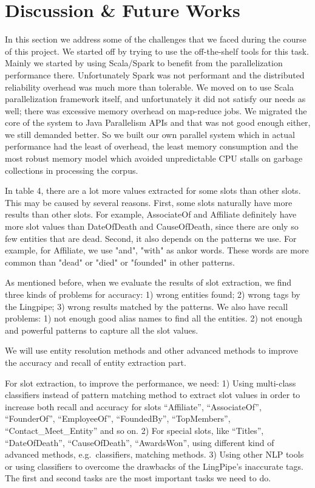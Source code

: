 

\section{Discussion \& Future Works}

In this section we address some of the challenges that we faced during the course of this project. We started 
off by trying to use the off-the-shelf tools for this task. Mainly we started 
by using Scala/Spark\cite{ferc11} to benefit from the parallelization 
performance there. Unfortunately Spark was not performant and the distributed reliability overhead 
was much more than tolerable. We moved on to use Scala parallelization  framework itself, and unfortunately it did not satisfy our needs as well; there was 
excessive memory overhead on map-reduce jobs. We migrated the core of the 
system to Java Parallelism APIs and that was not good enough either, we still demanded 
better. So we built our own parallel system which in actual performance had 
the least of overhead, the least memory consumption and the most robust memory 
model which avoided unpredictable CPU stalls on garbage collections in 
processing the corpus.

In table 4, there are a lot more values extracted for some slots than other slots. This may be caused by several reasons.
First, some slots naturally have more results than other slots. For example, AssociateOf and Affiliate definitely have more slot values than DateOfDeath and CauseOfDeath, since there are only so few entities that are dead. Second, it also depends on the patterns we use. For example, for Affiliate, we use "and", "with" as ankor words. These words are more common than "dead" or "died" or "founded" in other patterns. 

As mentioned before, when we evaluate the results of slot extraction, we find 
three kinds of problems for accuracy: 1) wrong entities found; 2) wrong tags 
by the Lingpipe; 3) wrong results matched by the patterns.  We also have 
recall problems: 1) not enough good alias names to find all the entities. 2) 
not enough and powerful patterns to capture all the slot values. 

We will use entity resolution methods and other advanced methods to improve 
the accuracy and recall of entity extraction part. 

For slot extraction, to improve the performance, we need: 1) Using multi-class classifiers instead of pattern matching method to 
extract slot values in order to increase both recall and accuracy for slots
``Affiliate'', ``AssociateOf'', ``FounderOf'', ``EmployeeOf'', ``FoundedBy'',
``TopMembers'', ``Contact\_Meet\_Entity'' and so on. 2) For special slots, 
like ``Titles'', ``DateOfDeath'', ``CauseOfDeath'', ``AwardsWon'', using different 
kind of advanced methods, e.g.\ classifiers, matching methods. 3) Using other 
NLP tools or using classifiers to overcome the drawbacks of the LingPipe’s 
inaccurate tags. The first and second tasks are the most important tasks we 
need to do.

